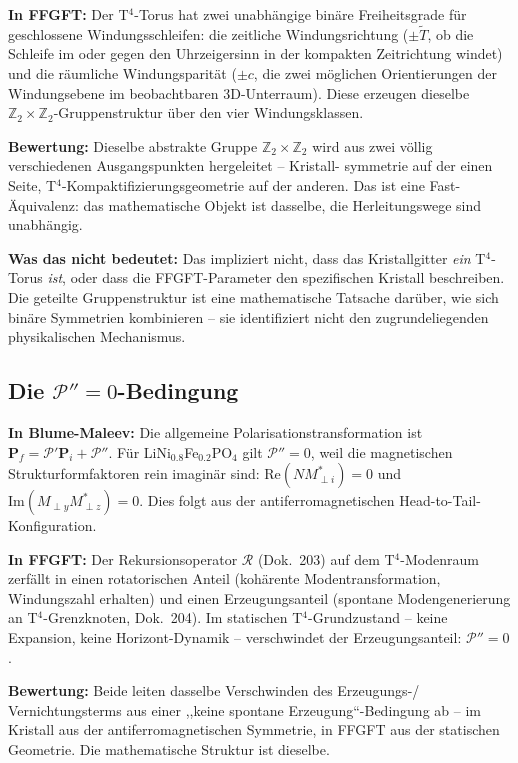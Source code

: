 \textbf{In FFGFT:} Der T$^4$-Torus hat zwei unabhängige binäre Freiheitsgrade
für geschlossene Windungsschleifen: die zeitliche Windungsrichtung ($\pm\tilde{T}$,
ob die Schleife im oder gegen den Uhrzeigersinn in der kompakten Zeitrichtung
windet) und die räumliche Windungsparität ($\pm c$, die zwei möglichen
Orientierungen der Windungsebene im beobachtbaren 3D-Unterraum). Diese
erzeugen dieselbe $\mathbb{Z}_2\times\mathbb{Z}_2$-Gruppenstruktur über den
vier Windungsklassen.

\textbf{Bewertung:} Dieselbe abstrakte Gruppe $\mathbb{Z}_2\times\mathbb{Z}_2$
wird aus zwei völlig verschiedenen Ausgangspunkten hergeleitet -- Kristall-
symmetrie auf der einen Seite, T$^4$-Kompaktifizierungsgeometrie auf der
anderen. Das ist eine Fast-Äquivalenz: das mathematische Objekt ist dasselbe,
die Herleitungswege sind unabhängig.

\textbf{Was das nicht bedeutet:} Das impliziert nicht, dass das Kristallgitter
\emph{ein} T$^4$-Torus \emph{ist}, oder dass die FFGFT-Parameter den
spezifischen Kristall beschreiben. Die geteilte Gruppenstruktur ist eine
mathematische Tatsache darüber, wie sich binäre Symmetrien kombinieren --
sie identifiziert nicht den zugrundeliegenden physikalischen Mechanismus.

\subsection{Die $\mathcal{P}'' = 0$-Bedingung}

\textbf{In Blume-Maleev:} Die allgemeine Polarisationstransformation ist
$\mathbf{P}_f = \mathcal{P}'\mathbf{P}_i + \mathcal{P}''$. Für
LiNi$_{0.8}$Fe$_{0.2}$PO$_4$ gilt $\mathcal{P}'' = 0$, weil die magnetischen
Strukturformfaktoren rein imaginär sind: $\mathrm{Re}(NM_{\perp i}^*) = 0$
und $\mathrm{Im}(M_{\perp y}M_{\perp z}^*) = 0$. Dies folgt aus der
antiferromagnetischen Head-to-Tail-Konfiguration.

\textbf{In FFGFT:} Der Rekursionsoperator $\mathcal{R}$ (Dok.~203) auf dem
T$^4$-Modenraum zerfällt in einen rotatorischen Anteil (kohärente
Modentransformation, Windungszahl erhalten) und einen Erzeugungsanteil
(spontane Modengenerierung an T$^4$-Grenzknoten, Dok.~204). Im statischen
T$^4$-Grundzustand -- keine Expansion, keine Horizont-Dynamik -- verschwindet
der Erzeugungsanteil: $\mathcal{P}'' = 0$.

\textbf{Bewertung:} Beide leiten dasselbe Verschwinden des Erzeugungs-/
Vernichtungsterms aus einer ,,keine spontane Erzeugung``-Bedingung ab --
im Kristall aus der antiferromagnetischen Symmetrie, in FFGFT aus der
statischen Geometrie. Die mathematische Struktur ist dieselbe.


